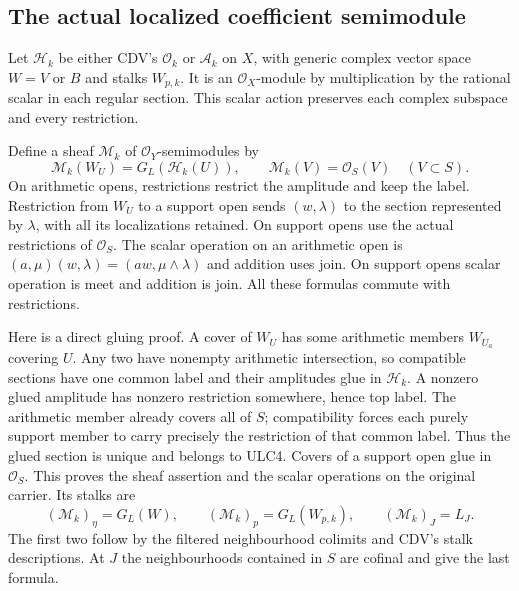 \subsection{The actual localized coefficient semimodule}
Let $\mathcal H_k$ be either CDV's $\mathcal O_k$ or $\mathcal A_k$
on $X$, with generic complex vector space $W=V$ or $B$ and stalks
$W_{p,k}$. It is an $\mathcal O_X$-module by multiplication by the
rational scalar in each regular section. This scalar action preserves
each complex subspace and every restriction.

Define a sheaf $\mathcal M_k$ of $\mathcal O_Y$-semimodules by
\begin{equation}\tag{ULC4}
 \mathcal M_k(W_U)=G_L(\mathcal H_k(U)),\qquad
 \mathcal M_k(V)=\mathcal O_S(V)\quad(V\subset S).
\end{equation}
On arithmetic opens, restrictions restrict the amplitude and keep
the label. Restriction from $W_U$ to a support open sends
$(w,\lambda)$ to the section represented by $\lambda$, with all its
localizations retained. On support opens use the actual restrictions
of $\mathcal O_S$. The scalar operation on an arithmetic open is
$(a,\mu)(w,\lambda)=(aw,\mu\wedge\lambda)$ and addition uses join.
On support opens scalar operation is meet and addition is join.
All these formulas commute with restrictions.

Here is a direct gluing proof. A cover of $W_U$ has some arithmetic
members $W_{U_a}$ covering $U$. Any two have nonempty arithmetic
intersection, so compatible sections have one common label and their
amplitudes glue in $\mathcal H_k$. A nonzero glued amplitude has
nonzero restriction somewhere, hence top label. The arithmetic member
already covers all of $S$; compatibility forces each purely support
member to carry precisely the restriction of that common label.
Thus the glued section is unique and belongs to ULC4. Covers of a
support open glue in $\mathcal O_S$. This proves the sheaf assertion
and the scalar operations on the original carrier. Its stalks are
\begin{equation}\tag{ULC5}
 (\mathcal M_k)_\eta=G_L(W),\qquad
 (\mathcal M_k)_p=G_L(W_{p,k}),\qquad
 (\mathcal M_k)_J=L_J.
\end{equation}
The first two follow by the filtered neighbourhood colimits and CDV's
stalk descriptions. At $J$ the neighbourhoods contained in $S$ are
cofinal and give the last formula.

